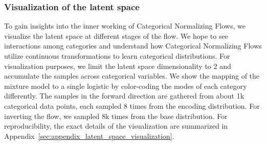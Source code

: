 \subsubsection{Visualization of the latent space} 
\label{sec:experiments_discussion_latent_space}

To gain insights into the inner working of Categorical Normalizing Flows, we visualize the latent space at different stages of the flow.
We hope to see interactions among categories and understand how Categorical Normalizing Flows utilize continuous transformations to learn categorical distributions.
For visualization purposes, we limit the latent space dimensionality to 2 and accumulate the samples across categorical variables. 
We show the mapping of the mixture model to a single logistic by color-coding the modes of each category differently.
The samples in the forward direction are gathered from about 1k categorical data points, each sampled 8 times from the encoding distribution.
For inverting the flow, we sampled 8k times from the base distribution.
For reproducibility, the exact details of the visualization are summarized in Appendix~\ref{sec:appendix_latent_space_visualization}.

